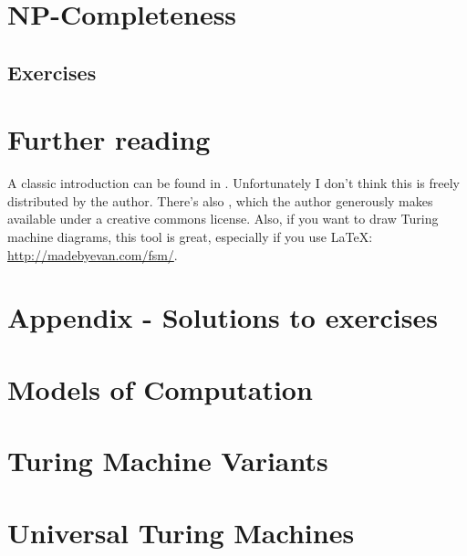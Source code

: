 \documentclass{article}
\theoremstyle{plain}
\newcommand{\NP}{\mathbf{NP}}
\newcommand*{\prefix}{}
\begin{document}
\section{$\NP$-Completeness}

\subsection{Exercises}

\newpage
\section{Further reading}
A classic introduction can be found in \cite{Sip12}. Unfortunately I don't think this is freely distributed by the author. There's also \cite{Sav98}, which the author generously makes available under a creative commons license.  Also, if you want to draw Turing machine diagrams, this tool is great, especially if you use LaTeX: \url{http://madebyevan.com/fsm/}. 


\newpage
{}
\renewcommand*{\prefix}{PAD}


\section{Appendix - Solutions to exercises}
\setcounter{section}{2}
\section*{Models of Computation}


\section*{Turing Machine Variants}
\setcounter{section}{3}
\setcounter{Q}{0}


\section*{Universal Turing Machines}
\setcounter{section}{4}
\setcounter{Q}{0}

\end{document}
